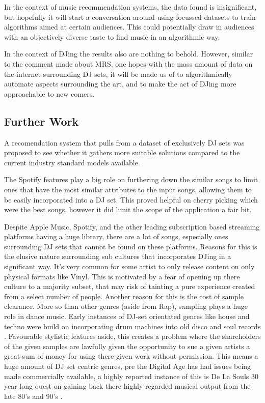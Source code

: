 In the context of music recommendation systems, the data found is insignificant, but hopefully it will start a conversation around using focussed datasets to train algorithms aimed at certain audiences. This could potentially draw in audiences with an objectively diverse taste to find music in an algorithmic way.

In the context of DJing the results also are nothing to behold. However, similar to the comment made about MRS, one hopes with the mass amount of data on the internet surrounding DJ sets, it will be made us of to algorithmically automate aspects surrounding the art, and to make the act of DJing more approachable to new comers. 

\subsection{Further Work}

A recomendation system that pulls from a dataset of exclusively DJ sets was proposed to see whether it gathers more suitable solutions compared to the current industry standard models available. 

The Spotify features play a big role on furthering down the similar songs to limit ones that have the most similar attributes to the input songs, allowing them to be easily incorporated into a DJ set. This proved helpful on cherry picking which were the best songs, however it did limit the scope of the application a fair bit. 

Despite Apple Music, Spotify, and the other leading subscription based streaming platforms having a huge library, there are a lot of songs, especially ones surrounding DJ sets that cannot be found on these platforms. Reasons for this is the elusive nature surrounding sub cultures that incorporates DJing in a significant way. It's very common for some artist to only release content on only physical formats like Vinyl. This is motivated by a fear of opening up there culture to a majority subset, that may risk of tainting a pure experience created from a select number of people. Another reason for this is the cost of sample clearance. More so than other genres (aside from Rap), sampling plays a huge role in dance music. Early instances of DJ-set orientated genres like house and techno were build on incorporating drum machines into old disco and soul records \citep{reynolds_energy_2013}. Favourable stylistic features aside, this creates a problem where the shareholders of the given samples are lawfully given the opportunity to sue a given artists a great sum of money for using there given work without permission. This means a huge amount of DJ set centric genres, pre the Digital Age has had issues being made commercially available, a highly reported instance of this is De La Souls 30 year long quest on gaining back there highly regarded musical output from the late 80's and 90's \citep{saunders_soul_2023}.

